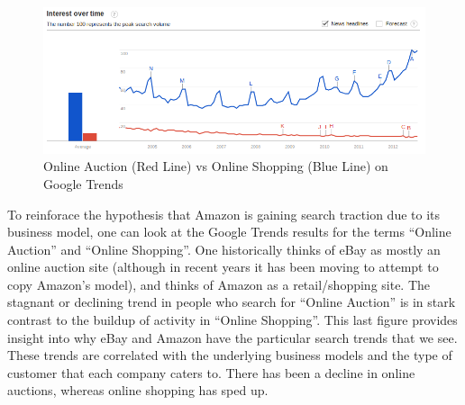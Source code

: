 \documentclass[psamsfonts]{amsart}
\newenvironment{sol}{{\bfseries Solution:}}{\qedsymbol}
\begin{document}
\begin{sol}
\begin{figure}[h!]
\includegraphics[width=6in]{online_shopping_vs_auction.png}
\caption{Online Auction (Red Line) vs Online Shopping (Blue Line) on Google Trends}
\end{figure}

To reinforace the hypothesis that Amazon is gaining search traction due to its business model, one can look at the Google Trends results for the terms ``Online Auction'' and ``Online Shopping''. One historically thinks of eBay as mostly an online auction site (although in recent years it has been moving to attempt to copy Amazon's model), and thinks of Amazon as a retail/shopping site. The stagnant or declining trend in people who search for ``Online Auction'' is in stark contrast to the buildup of activity in ``Online Shopping''. This last figure provides insight into why eBay and Amazon have the particular search trends that we see. These trends are correlated with the underlying business models and the type of customer that each company caters to. There has been a decline in online auctions, whereas online shopping has sped up. 
\end{sol}
\end{document}
